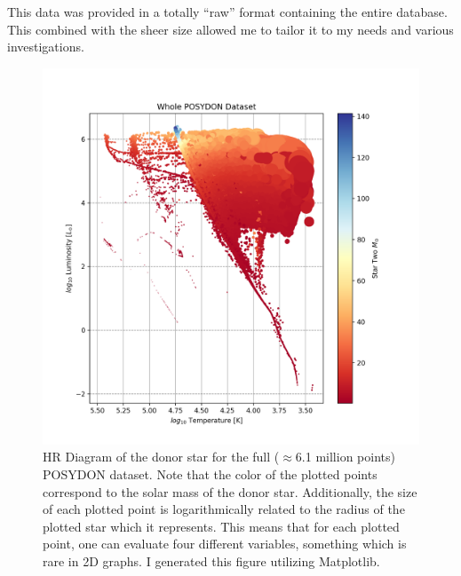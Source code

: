\documentclass[12pt, a4paper]{article}
\begin{document}
    This data was provided in a totally ``raw'' format containing the entire database. This combined with the sheer size allowed me to tailor it to my needs and various investigations.  

    \begin{figure} [H]
        \centering
        \includegraphics[scale = .5]{figs/GeneratedFigs/WholePOSYDONDatasetExample.png}
        \caption{HR Diagram of the donor star for the full ($\approx$6.1 million points) POSYDON dataset. Note that the color of the plotted points correspond to the solar mass of the donor star. Additionally, the size of each plotted point is logarithmically related to the radius of the plotted star which it represents. This means that for each plotted point, one can evaluate four different variables, something which is rare in 2D graphs. I generated this figure utilizing Matplotlib.}
        \label{EntireDataSetHR}
    \end{figure}
\end{document}
